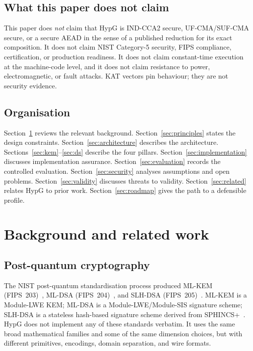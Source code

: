 \documentclass[11pt,a4paper]{article}
\theoremstyle{plain}
\theoremstyle{definition}
\theoremstyle{remark}
\begin{document}
\subsection{What this paper does not claim}

This paper does \emph{not} claim that HypG is IND-CCA2 secure,
UF-CMA/SUF-CMA secure, or a secure AEAD in the sense of a published
reduction for its exact composition.  It does not claim NIST Category-5
security, FIPS compliance, certification, or production readiness.  It
does not claim constant-time execution at the machine-code level, and
it does not claim resistance to power, electromagnetic, or fault
attacks.  KAT vectors pin behaviour; they are not security evidence.

\subsection{Organisation}

Section~\ref{sec:background} reviews the relevant background.
Section~\ref{sec:principles} states the design constraints.
Section~\ref{sec:architecture} describes the architecture.
Sections~\ref{sec:kem}--\ref{sec:ds} describe the four pillars.
Section~\ref{sec:implementation} discusses implementation assurance.
Section~\ref{sec:evaluation} records the controlled evaluation.
Section~\ref{sec:security} analyses assumptions and open problems.
Section~\ref{sec:validity} discusses threats to validity.
Section~\ref{sec:related} relates HypG to prior work.
Section~\ref{sec:roadmap} gives the path to a defensible profile.

\section{Background and related work}
\label{sec:background}

\subsection{Post-quantum cryptography}

The NIST post-quantum standardisation process produced ML-KEM
(FIPS~203)~\cite{fips203}, ML-DSA (FIPS~204)~\cite{fips204}, and
SLH-DSA (FIPS~205)~\cite{fips205}.  ML-KEM is a Module-LWE KEM;
ML-DSA is a Module-LWE/Module-SIS signature scheme; SLH-DSA is a
stateless hash-based signature scheme derived from
SPHINCS+~\cite{sphincs}.  HypG does not implement any of these
standards verbatim.  It uses the same broad mathematical families and
some of the same dimension choices, but with different primitives,
encodings, domain separation, and wire formats.
\end{document}
